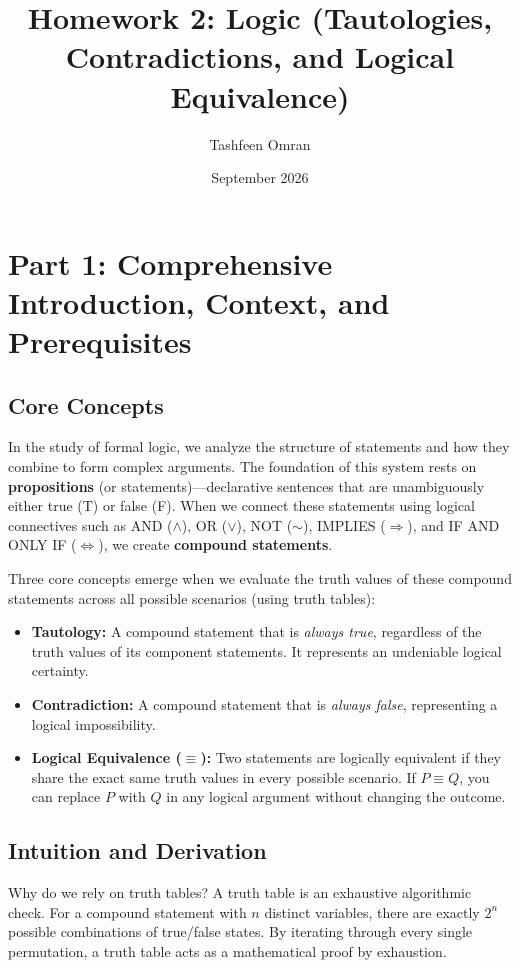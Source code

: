 \documentclass{article}
\title{Homework 2: Logic (Tautologies, Contradictions, and Logical Equivalence)}
\author{Tashfeen Omran}
\date{September 2026}
\begin{document}
\maketitle

\section*{Part 1: Comprehensive Introduction, Context, and Prerequisites}

\subsection*{Core Concepts}
In the study of formal logic, we analyze the structure of statements and how they combine to form complex arguments. The foundation of this system rests on \textbf{propositions} (or statements)---declarative sentences that are unambiguously either true (T) or false (F). When we connect these statements using logical connectives such as AND ($\land$), OR ($\lor$), NOT ($\sim$), IMPLIES ($\Rightarrow$), and IF AND ONLY IF ($\Leftrightarrow$), we create \textbf{compound statements}.

Three core concepts emerge when we evaluate the truth values of these compound statements across all possible scenarios (using truth tables):
\begin{itemize}
    \item \textbf{Tautology:} A compound statement that is \textit{always true}, regardless of the truth values of its component statements. It represents an undeniable logical certainty.
    \item \textbf{Contradiction:} A compound statement that is \textit{always false}, representing a logical impossibility.
    \item \textbf{Logical Equivalence ($\equiv$):} Two statements are logically equivalent if they share the exact same truth values in every possible scenario. If $P \equiv Q$, you can replace $P$ with $Q$ in any logical argument without changing the outcome.
\end{itemize}

\subsection*{Intuition and Derivation}
Why do we rely on truth tables? A truth table is an exhaustive algorithmic check. For a compound statement with $n$ distinct variables, there are exactly $2^n$ possible combinations of true/false states. By iterating through every single permutation, a truth table acts as a mathematical proof by exhaustion. 
\end{document}
